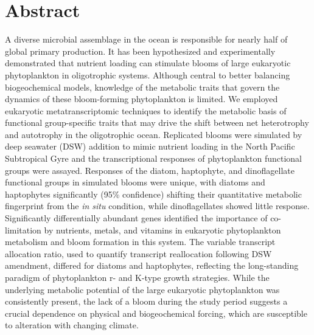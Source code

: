 \section{Abstract} 
A diverse microbial assemblage in the ocean is responsible for nearly half of global primary production. It has been hypothesized and experimentally demonstrated that nutrient loading can stimulate blooms of large eukaryotic phytoplankton in oligotrophic systems. Although central to better balancing biogeochemical models, knowledge of the metabolic traits that govern the dynamics of these bloom-forming phytoplankton is limited. We employed eukaryotic metatranscriptomic techniques to identify the metabolic basis of functional group-specific traits that may drive the shift between net heterotrophy and autotrophy in the oligotrophic ocean. Replicated blooms were simulated by deep seawater (DSW) addition to mimic nutrient loading in the North Pacific Subtropical Gyre and the transcriptional responses of phytoplankton functional groups were assayed. Responses of the diatom, haptophyte, and dinoflagellate functional groups in simulated blooms were unique, with diatoms and haptophytes significantly (95\% confidence) shifting their quantitative metabolic fingerprint from the \textit{in situ} condition, while dinoflagellates showed little response. Significantly differentially abundant genes identified the importance of co-limitation by nutrients, metals, and vitamins in eukaryotic phytoplankton metabolism and bloom formation in this system. The variable transcript allocation ratio, used to quantify transcript reallocation following DSW amendment, differed for diatoms and haptophytes, reflecting the long-standing paradigm of phytoplankton r- and K-type growth strategies. While the underlying metabolic potential of the large eukaryotic phytoplankton was consistently present, the lack of a bloom during the study period suggests a crucial dependence on physical and biogeochemical forcing, which are susceptible to alteration with changing climate. 
 
